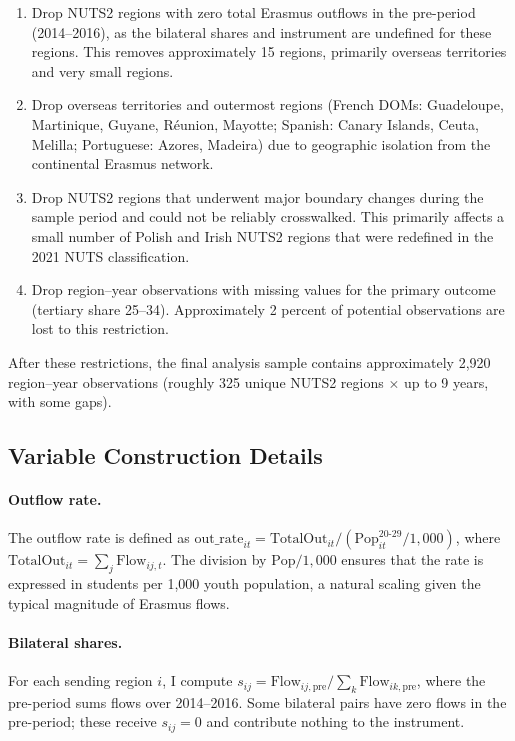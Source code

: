\documentclass[12pt]{article}
\begin{document}
\begin{enumerate}
    \item Drop NUTS2 regions with zero total Erasmus outflows in the pre-period (2014--2016), as the bilateral shares and instrument are undefined for these regions. This removes approximately 15 regions, primarily overseas territories and very small regions.
    \item Drop overseas territories and outermost regions (French DOMs: Guadeloupe, Martinique, Guyane, R\'{e}union, Mayotte; Spanish: Canary Islands, Ceuta, Melilla; Portuguese: Azores, Madeira) due to geographic isolation from the continental Erasmus network.
    \item Drop NUTS2 regions that underwent major boundary changes during the sample period and could not be reliably crosswalked. This primarily affects a small number of Polish and Irish NUTS2 regions that were redefined in the 2021 NUTS classification.
    \item Drop region--year observations with missing values for the primary outcome (tertiary share 25--34). Approximately 2 percent of potential observations are lost to this restriction.
\end{enumerate}

After these restrictions, the final analysis sample contains approximately 2,920 region--year observations (roughly 325 unique NUTS2 regions $\times$ up to 9 years, with some gaps).

\subsection{Variable Construction Details}

\paragraph{Outflow rate.} The outflow rate is defined as $\text{out\_rate}_{it} = \text{TotalOut}_{it} / (\text{Pop}^{20\text{-}29}_{it} / 1{,}000)$, where $\text{TotalOut}_{it} = \sum_j \text{Flow}_{ij,t}$. The division by $\text{Pop}/1{,}000$ ensures that the rate is expressed in students per 1,000 youth population, a natural scaling given the typical magnitude of Erasmus flows.

\paragraph{Bilateral shares.} For each sending region $i$, I compute $s_{ij} = \text{Flow}_{ij,\text{pre}} / \sum_k \text{Flow}_{ik,\text{pre}}$, where the pre-period sums flows over 2014--2016. Some bilateral pairs have zero flows in the pre-period; these receive $s_{ij} = 0$ and contribute nothing to the instrument.
\end{document}
